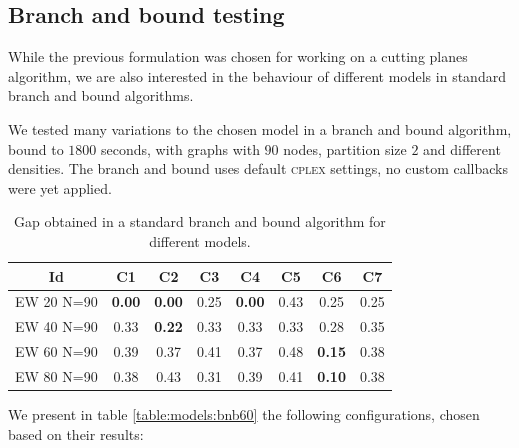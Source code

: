 \subsection{Branch and bound testing}

While the previous formulation was chosen for working on a cutting planes algorithm, we are also interested in the behaviour of different models in standard branch and bound algorithms. 

We tested many variations to the chosen model in a branch and bound algorithm, bound to $1800$ seconds, with graphs with $90$ nodes, partition size $2$ and different densities. The branch and bound uses default \textsc{cplex} settings, no custom callbacks were yet applied.

\begin{table}
\label{table:models:bnb}
\centering

\begin{tabular}{|c|c|c|c|c|c|c|c|}
\hline
\multicolumn{1}{|c|}{Id} & \multicolumn{1}{|c|}{C1} & \multicolumn{1}{|c|}{C2} & \multicolumn{1}{|c|}{C3}  & \multicolumn{1}{|c|}{C4} & \multicolumn{1}{|c|}{C5} & \multicolumn{1}{|c|}{C6} & \multicolumn{1}{|c|}{C7} 
\\
\hline
EW 20 N=90 & \textbf{0.00} & \textbf{0.00} & 0.25  & \textbf{0.00} & 0.43 & 0.25 & 0.25
\\
EW 40 N=90 & 0.33 & \textbf{0.22} & 0.33 & 0.33 & 0.33 & 0.28 & 0.35
\\
EW 60 N=90 & 0.39 & 0.37 & 0.41 & 0.37 & 0.48 & \textbf{0.15} & 0.38
\\
EW 80 N=90 & 0.38 & 0.43 & 0.31 & 0.39 & 0.41 & \textbf{0.10} & 0.38
\\
\hline 
 \end{tabular}

\caption{Gap obtained in a standard branch and bound algorithm for different models.}

\end{table}

We present in table \ref{table:models:bnb60} the following configurations, chosen based on their results:

\begin{itemize}
\end{itemize}

